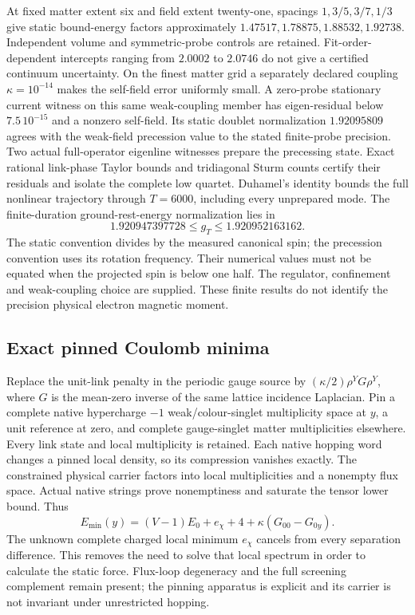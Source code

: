 At fixed matter extent six and field extent twenty-one, spacings
$1,3/5,3/7,1/3$ give static bound-energy factors approximately
$1.47517,1.78875,1.88532,1.92738$. Independent volume and symmetric-probe
controls are retained. Fit-order-dependent intercepts ranging from
$2.0002$ to $2.0746$ do not give a certified continuum uncertainty.
On the finest matter grid a separately declared coupling
$\kappa=10^{-14}$ makes the self-field error uniformly small. A zero-probe stationary current witness on this same weak-coupling member
has eigen-residual below $7.5\,10^{-15}$ and a nonzero self-field. Its
static doublet normalization $1.92095809$ agrees with the weak-field
precession value to the stated finite-probe precision. Two
actual full-operator eigenline witnesses prepare the precessing state.
Exact rational link-phase Taylor bounds and tridiagonal Sturm counts
certify their residuals and isolate the complete low quartet.
Duhamel's identity bounds the full nonlinear trajectory through $T=6000$,
including every unprepared mode. The finite-duration ground-rest-energy
normalization lies in
\[
 1.920947397728\leq g_T\leq1.920952163162.
\]
The static convention divides by the measured canonical spin; the
precession convention uses its rotation frequency. Their numerical
values must not be equated when the projected spin is below one half.
The regulator, confinement and weak-coupling choice are supplied.
These finite results do not identify the precision physical electron
magnetic moment.

\subsection{Exact pinned Coulomb minima}

Replace the unit-link penalty in the periodic gauge source by
$(\kappa/2)\rho^Y G\rho^Y$, where $G$ is the mean-zero inverse of the
same lattice incidence Laplacian. Pin a complete native hypercharge
$-1$ weak/colour-singlet multiplicity space at $y$, a unit reference
at zero, and complete gauge-singlet matter multiplicities elsewhere.
Every link state and local multiplicity is retained. Each native hopping
word changes a pinned local density, so its compression vanishes exactly.
The constrained physical carrier factors into local multiplicities and
a nonempty flux space. Actual native strings prove nonemptiness and
saturate the tensor lower bound. Thus
\[
 E_{\min}(y)=(V-1)E_0+e_\chi+4+
                       \kappa(G_{00}-G_{0y}).
\]
The unknown complete charged local minimum $e_\chi$ cancels from every
separation difference. This removes the need to solve that local spectrum
in order to calculate the static force. Flux-loop degeneracy and the
full screening complement remain present; the pinning apparatus is
explicit and its carrier is not invariant under unrestricted hopping.

